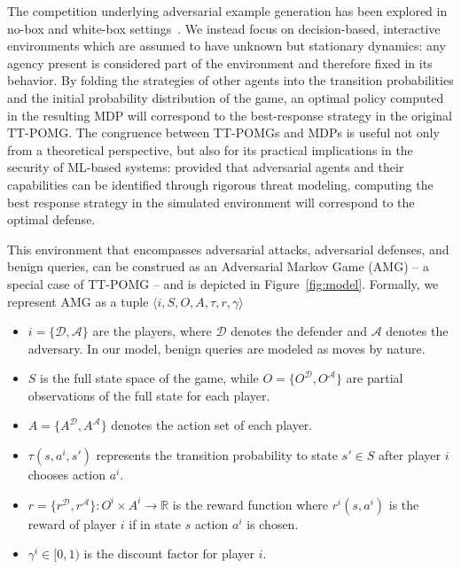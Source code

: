 The competition underlying adversarial example generation has been explored in no-box and white-box settings~\cite{bose2020adversarial, gao2022achieving}.
We instead focus on decision-based, interactive environments which are assumed to have unknown but stationary dynamics: any agency present is considered part of the environment and therefore fixed in its behavior.
By folding the strategies of other agents into the transition probabilities and the initial probability distribution of the game, an optimal policy computed in the resulting MDP will correspond to the best-response strategy in the original TT-POMG.
The congruence between TT-POMGs and MDPs is useful not only from a theoretical perspective, but also for its practical implications in the security of ML-based systems: provided that adversarial agents and their capabilities can be identified through rigorous threat modeling, computing the best response strategy in the simulated environment will correspond to the optimal defense.

This environment that encompasses adversarial attacks, adversarial defenses, and benign queries, can be construed as an Adversarial Markov Game (AMG) -- a special case of TT-POMG -- and is depicted in Figure~\ref{fig:model}.
Formally, we represent AMG as a tuple $\langle i, S, O, A, \tau, r, \gamma \rangle$
\begin{itemize}
    \item $i = \{\mathcal{D}, \mathcal{A}\}$ are the players, where $\mathcal{D}$ denotes the defender and $\mathcal{A}$ denotes the adversary. In our model, benign queries are modeled as moves by nature.
    \item $S$ is the full state space of the game, while $O = \{O^{\mathcal{D}}, O^{\mathcal{A}}\}$ are partial observations of the full state for each player.
    \item $A = \{A^{\mathcal{D}}, A^{\mathcal{A}}\}$ denotes the action set of each player.
    \item $\tau(s,a^{i},s')$ represents the transition probability to state $s' \in S$ after player $i$ chooses action $a^i$.
    \item $r = \{r^{\mathcal{D}}, r^{\mathcal{A}}\} : O^i \times A^i \rightarrow \mathbb{R}$ is the reward function where $r^i(s, a^i)$ is the reward of player $i$ if in state $s$ action $a^i$ is chosen.
    \item $\gamma^i \in [0,1)$ is the discount factor for player $i$.
\end{itemize}

